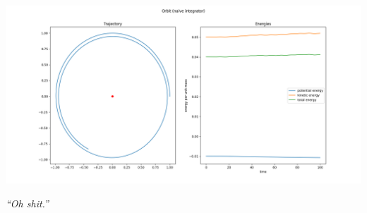 
\begin{frame}
%
\includegraphics[width=\linewidth]{./gfx/04-orbital-mechanics}

\begin{center}
\emph{\enquote{Oh shit.}}
\end{center}
%
\end{frame}


